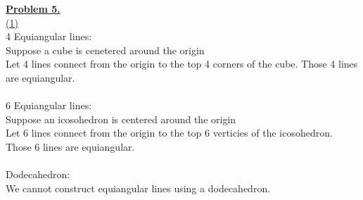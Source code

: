 \documentclass[12pt]{article}
\begin{document}
	\newpage
	{\LARGE \noindent \underline{\textbf{Problem 5.}}}\\

	\hyperlink{toc}{\hypertarget{5.1}{(1)}}\\
	4 Equiangular lines:\\
	Suppose a cube is cenetered around the origin\\
	Let 4 lines connect from the origin to the top 4 corners of the cube. Those 4 lines are equiangular.
	\\\\
	6 Equiangular lines:\\
	Suppose an icosohedron is centered around the origin\\
	Let 6 lines connect from the origin to the top 6 verticies of the icosohedron. Those 6 lines are equiangular.
	\\\\
	Dodecahedron:\\
	We cannot construct equiangular lines using a dodecahedron.
	\\\\\\\\\\\\\\\\\\
\end{document}
